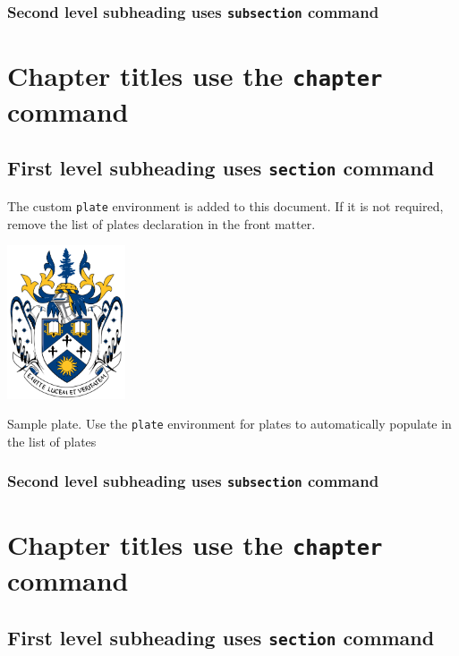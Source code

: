 \documentclass[openany, 12pt]{book}
\begin{document}
\subsection{Second level subheading uses \texttt{subsection} command}

\chapter{Chapter titles use the \texttt{chapter} command}

\section{First level subheading uses \texttt{section} command}

{%
The custom \texttt{plate} environment is added to this document. If it is not required, remove the list of plates declaration in the front matter.

\begin{plate}
    \centering
    \includegraphics[width=3.5cm]{laurentian-university-coa.png}
    \caption{Sample plate. Use the \texttt{plate} environment for plates to automatically populate in the list of plates}
\end{plate}

{%
\subsection{Second level subheading uses \texttt{subsection} command}

\chapter{Chapter titles use the \texttt{chapter} command}

\section{First level subheading uses \texttt{section} command}

}}
\end{document}
